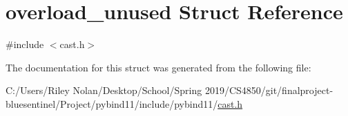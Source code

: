 \hypertarget{structoverload__unused}{}\section{overload\+\_\+unused Struct Reference}
\label{structoverload__unused}


{\ttfamily \#include $<$cast.\+h$>$}



The documentation for this struct was generated from the following file\+:\begin{DoxyCompactItemize}
\item 
C\+:/\+Users/\+Riley Nolan/\+Desktop/\+School/\+Spring 2019/\+C\+S4850/git/finalproject-\/bluesentinel/\+Project/pybind11/include/pybind11/\mbox{\hyperlink{cast_8h}{cast.\+h}}\end{DoxyCompactItemize}
